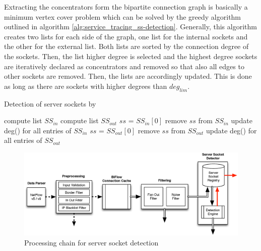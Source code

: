 Extracting the concentrators form the bipartite connection graph is basically a minimum vertex cover problem which can be solved by the greedy algorithm outlined in algorithm \ref{alg:service_tracing_ss-detection}. Generally, this algorithm creates two lists for each side of the graph, one list for the internal sockets and the other for the external list. Both lists are sorted by the connection degree of the sockets. Then, the list higher degree is selected and the highest degree sockets are iteratively declared as concentrators and removed so that also all edges to other sockets are removed. Then, the lists are accordingly updated. This is done as long as there are sockets with higher degrees than $deg_{lim}$. 

\begin{algorithm}[t!]
\caption{Detection of server sockets by \citet{Schatzmann:Mining,Schatzmann:Dissection, Schatzmann:Tracing}}
\label{alg:service_tracing_ss-detection}
\begin{algorithmic}
\STATE
\STATE compute list $SS_{in}$ 
\STATE compute list $SS_{out}$ 
\STATE
{}
        \STATE $ss$ = $SS_{in}[0]$ 
        \STATE remove $ss$ from $SS_{in}$
        \STATE update deg() for all entries of $SS_{in}$
    \ENDWHILE
        \STATE $ss$ = $SS_{out}[0]$ 
        \STATE remove $ss$ from $SS_{out}$
        \STATE update deg() for all entries of $SS_{out}$
    \ENDWHILE
\ENDWHILE
\end{algorithmic}
\end{algorithm}

\begin{figure}
	[ht] \centering
	\includegraphics[width=\linewidth]{images/Detection_chain.eps}
	\caption{Processing chain for server socket detection}
	\label{fig:detection_chain}
\end{figure}

